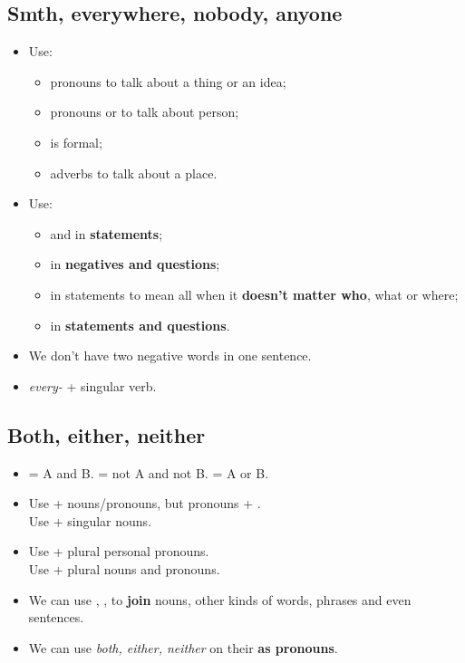 \subsection{Smth, everywhere, nobody, anyone}
\begin{itemize}
    \item Use:
    \begin{itemize}
        \item pronouns  to talk about a thing or an idea;
        \item pronouns  or  to talk about person;
        \item[\daash]  is formal;
        \item adverbs  to talk about a place.
    \end{itemize}
    \item Use:
    \begin{itemize}
        \item {} and  in \textbf{statements};
        \item {} in \textbf{negatives and questions};
        \item {} in statements to mean all when it \textbf{doesn't matter who}, what or where;
        \item {} in \textbf{statements and questions}.
    \end{itemize}
    \item[\ast] We don't have two negative words in one sentence.
    \item[\ast] \textit{every-} + singular verb.
\end{itemize}

\subsection{Both, either, neither}
\begin{itemize}
    \item {} = A and B.  = not A and not B.  = A or B\@.
    \item Use  + nouns/pronouns, but pronouns + .\\
    Use  + singular nouns.
    \item Use  + plural personal pronouns.\\
    Use  + plural nouns and pronouns.
    \item We can use , , 
    to \textbf{join} nouns, other kinds of words, phrases and even sentences.
    \item We can use \textit{both, either, neither} on their  \textbf{as pronouns}.
\end{itemize}

